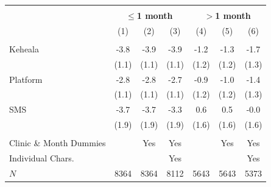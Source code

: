\scriptsize{
\begin{tabular}{l*{6}{c}}
\hline\hline \\[-8pt]
 & \multicolumn{3}{c}{\textbf{$\leq$1 month}} & \multicolumn{3}{c}{\textbf{$>$1 month}} \\
\rowcolor{yellow!15}            &\multicolumn{1}{c}{(1)}&\multicolumn{1}{c}{(2)}&\multicolumn{1}{c}{(3)}&\multicolumn{1}{c}{(4)}&\multicolumn{1}{c}{(5)}&\multicolumn{1}{c}{(6)}\\
\hline \\[-8pt]
Keheala & -3.8\sym{***} & -3.9\sym{***} & -3.9\sym{***} & -1.2 & -1.3 & -1.7 \\
            &   (1.1) &   (1.1) &   (1.1) &   (1.2) &   (1.2) &   (1.3)         \\
[0.4em]
Platform & -2.8\sym{**} & -2.8\sym{**} & -2.7\sym{*} & -0.9 & -1.0 & -1.4 \\
            &   (1.1) &   (1.1) &   (1.1) &   (1.2) &   (1.2) &   (1.3)         \\
[0.4em]
SMS & -3.7 & -3.7 & -3.3 & 0.6 & 0.5 & -0.0 \\
            &   (1.9) &   (1.9) &   (1.9) &   (1.6) &   (1.6) &   (1.6)         \\
[0.4em]
\hline
\hline \\[-8pt]
Clinic \& Month Dummies & & Yes & Yes & & Yes & Yes \\
Individual Chars. & & & Yes & & & Yes \\
\(N\)       &       8364         &       8364         &       8112         &       5643         &       5643         &       5373         \\
\hline\hline
\end{tabular}
}